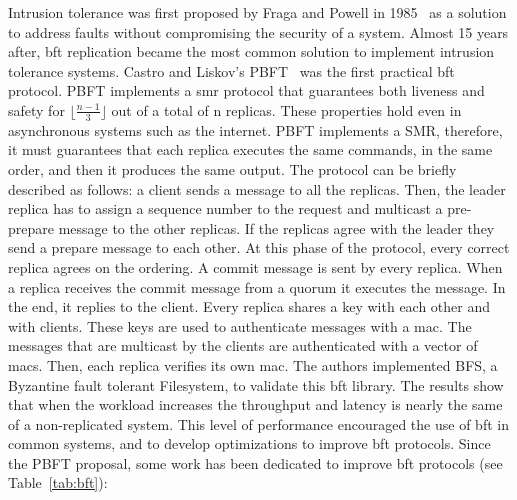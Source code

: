 Intrusion tolerance was first proposed by Fraga and Powell in 1985~\cite{Fraga:1985} as a solution to address faults without compromising the security of a system. 
Almost 15 years after, \gls{bft} replication became the most common solution to implement intrusion tolerance systems.
Castro and Liskov’s PBFT~\cite{Castro:1999} was the first practical \gls{bft} protocol. 
PBFT implements a \gls{smr} protocol that guarantees both liveness and safety for $\lfloor\frac{n-1}{3}\rfloor$ out of a total of n replicas. 
These properties hold even in asynchronous systems such as the internet. 
PBFT implements a SMR, therefore, it must guarantees that each replica executes the same commands, in the same order, and then it produces the same output. 
The protocol can be briefly described as follows: a client sends a message to all the replicas.
Then, the leader replica has to assign a sequence number to the request and multicast a pre-prepare message to the other replicas. 
If the replicas agree with the leader they send a prepare message to each other. 
At this phase of the protocol, every correct replica agrees on the ordering. 
A commit message is sent by every replica. When a replica receives the commit message from a quorum it executes the message. 
In the end, it replies to the client. 
Every replica shares a key with each other and with clients. These keys are used to authenticate messages with a \gls{mac}. 
The messages that are multicast by the clients are authenticated with a vector of \glspl{mac}. 
Then, each replica verifies its own \gls{mac}.
The authors implemented BFS, a Byzantine fault tolerant Filesystem, to validate this \gls{bft} library. 
The results show that when the workload increases the throughput and latency is nearly the same of a non-replicated system. 
This level of performance encouraged the use of \gls{bft} in common systems, and to develop optimizations to improve \gls{bft} protocols. 
Since the PBFT proposal, some work has been dedicated to improve \gls{bft} protocols (see Table~\ref{tab:bft}):


